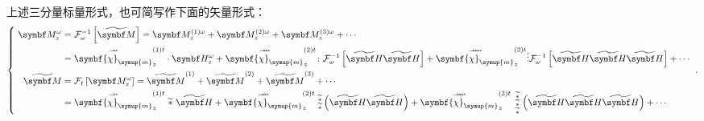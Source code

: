 上述三分量标量形式，也可简写作下面的矢量形式：
\begin{equation} \label{eq:2-3}
	\left\{\ \begin{aligned} \symbf M^\omega_z &= \mathcal F^{-1}_\omega \left[ \widetilde{\symbf M} \right] = \symbf M^{(1)\omega}_z + \symbf M^{(2)\omega}_z + \symbf M^{(3)\omega}_z + \cdots \\ &= \overset{\rightharpoonup\!\!\!\! \rightharpoonup}{\symbf{\chi}_{\symup{m}}}^{(1)t}_{z} \cdot \symbf H^{\omega}_z + \overset{\rightharpoonup\!\!\!\! \rightharpoonup\!\!\!\! \rightharpoonup}{\symbf{\chi}_{\symup{m}}}^{(2)t}_{z} \colon \mathcal F^{-1}_\omega \left[ \widetilde{\symbf H} \widetilde{\symbf H} \right] + \overset{\rightharpoonup\!\!\!\! \rightharpoonup\!\!\!\! \rightharpoonup\!\!\!\! \rightharpoonup}{\symbf{\chi}_{\symup{m}}}^{(3)t}_{z} \vdots \mathcal F^{-1}_\omega \left[ \widetilde{\symbf H} \widetilde{\symbf H} \widetilde{\symbf H} \right] + \cdots \\ \widetilde{\symbf M} &= \mathcal F_t \left[ \symbf M^{\omega}_z \right] = \widetilde{\symbf M}^{(1)} + \widetilde{\symbf M}^{(2)} + \widetilde{\symbf M}^{(3)} + \cdots \\&= \overset{\rightharpoonup\!\!\!\! \rightharpoonup}{\symbf{\chi}_{\symup{m}}}^{(1)t}_{z}\ \widetilde *\ \widetilde{\symbf H} + \overset{\rightharpoonup\!\!\!\! \rightharpoonup\!\!\!\! \rightharpoonup}{\symbf{\chi}_{\symup{m}}}^{(2)t}_{z}\ {}^{\widetilde *}_{\widetilde *} \left( \widetilde{\symbf H} \widetilde{\symbf H} \right) + \overset{\rightharpoonup\!\!\!\! \rightharpoonup\!\!\!\! \rightharpoonup\!\!\!\! \rightharpoonup}{\symbf{\chi}_{\symup{m}}}^{(3)t}_{z}\ \begin{smallmatrix} \widetilde * \\ \widetilde * \\ \widetilde * \end{smallmatrix} \left( \widetilde{\symbf H} \widetilde{\symbf H} \widetilde{\symbf H} \right) + \cdots \end{aligned}\right. ~.
\end{equation}

